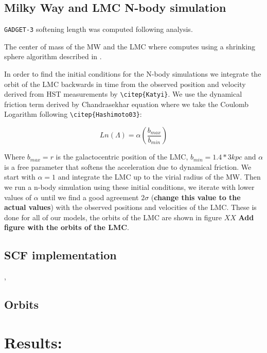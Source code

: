\documentclass[a4paper,fleqn,usenatbib]{mnras}
\begin{document}
\subsection{Milky Way and LMC N-body simulation}

\verb+GADGET-3+ \citep{Springel05}
softening length was computed following \citep{Power03} analysis.


The center of mass of the MW and the LMC where computes using a
shrinking sphere algorithm described in \citep{Power03}.


In order to find the initial conditions for the N-body simulations
we integrate the orbit of the LMC backwards in time from the observed
position and velocity derived from HST measurements by
\verb+\citep{Katyi}+. We use the dynamical friction term derived by 
Chandrasekhar equation \citep{Chandrasekhar44} where we take the
Coulomb Logarithm following \verb+\citep{Hashimoto03}+: 

\begin{equation}
Ln(\Lambda) = \alpha \left( \dfrac{b_{max}}{b_{min}} \right)
\end{equation}

Where $b_{max} = r$ is the galactocentric position of the LMC,
$b_{min}=1.4 * 3 kpc$ and $\alpha$ is a free parameter that 
softens the acceleration due to dynamical friction. We start with 
$\alpha=1$ and integrate the LMC up to the virial radius of the MW. 
Then we run a n-body simulation using these initial conditions, 
we iterate with lower values of $\alpha$ until we find a good agreement 
$2 \sigma$ (\textbf{change this value to the actual values}) with the
 observed positions and velocities of the LMC. These is done for all 
of our models, the orbits of the LMC are shown in figure $XX$ 
\textbf{Add figure with the orbits of the LMC}.

\subsection{SCF implementation}
\citep{Hernquist92}, \citep{Weinberg95}

\subsection{Orbits}



\section{Results:}
\end{document}
